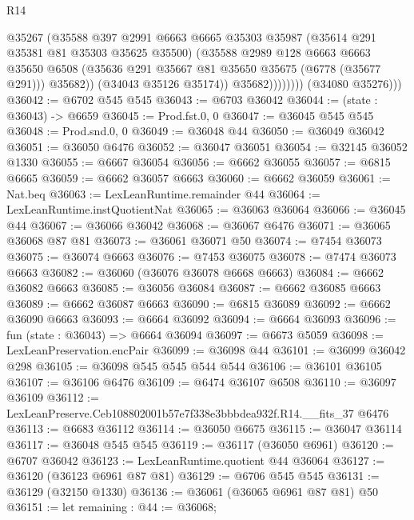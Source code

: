 \begin{lexlean}{R14}
\begin{coremodule}
                          @35267
                          (@35588
                            @397
                            @2991
                            @6663
                            @6665
                            @35303
                            @35987
                            (@35614 @291 @35381 @81 @35303 @35625 @35500)
                            (@35588
                              @2989
                              @128
                              @6663
                              @6663
                              @35650
                              @6508
                              (@35636 @291 @35667 @81 @35650 @35675 (@6778 (@35677 @291)))
                              @35682))
                          (@34043 @35126 @35174))
                        @35682))))))))
        (@34080 @35276)))
@36042 := @6702 @545 @545
@36043 := @6703 @36042
@36044 := (state : @36043) -> @6659
@36045 := Prod.fst.{0, 0}
@36047 := @36045 @545 @545
@36048 := Prod.snd.{0, 0}
@36049 := @36048 @44
@36050 := @36049 @36042
@36051 := @36050 @6476
@36052 := @36047 @36051
@36054 := @32145 @36052 @1330
@36055 := @6667 @36054
@36056 := @6662 @36055
@36057 := @6815 @6665
@36059 := @6662 @36057 @6663
@36060 := @6662 @36059
@36061 := Nat.beq
@36063 := LexLeanRuntime.remainder @44
@36064 := LexLeanRuntime.instQuotientNat
@36065 := @36063 @36064
@36066 := @36045 @44
@36067 := @36066 @36042
@36068 := @36067 @6476
@36071 := @36065 @36068 @87 @81
@36073 := @36061 @36071 @50
@36074 := @7454 @36073
@36075 := @36074 @6663
@36076 := @7453 @36075
@36078 := @7474 @36073 @6663
@36082 := @36060 (@36076 @36078 @6668 @6663)
@36084 := @6662 @36082 @6663
@36085 := @36056 @36084
@36087 := @6662 @36085 @6663
@36089 := @6662 @36087 @6663
@36090 := @6815 @36089
@36092 := @6662 @36090 @6663
@36093 := @6664 @36092
@36094 := @6664 @36093
@36096 := fun (state : @36043) => @6664 @36094
@36097 := @6673 @5059
@36098 := LexLeanPreservation.encPair
@36099 := @36098 @44
@36101 := @36099 @36042 @298
@36105 := @36098 @545 @545 @544 @544
@36106 := @36101 @36105
@36107 := @36106 @6476
@36109 := @6474 @36107 @6508
@36110 := @36097 @36109
@36112 := LexLeanPreserve.Ceb108802001b57e7f338e3bbbdea932f.R14.__fits_37 @6476
@36113 := @6683 @36112
@36114 := @36050 @6675
@36115 := @36047 @36114
@36117 := @36048 @545 @545
@36119 := @36117 (@36050 @6961)
@36120 := @6707 @36042
@36123 := LexLeanRuntime.quotient @44 @36064
@36127 := @36120 (@36123 @6961 @87 @81)
@36129 := @6706 @545 @545
@36131 := @36129 (@32150 @1330)
@36136 := @36061 (@36065 @6961 @87 @81) @50
@36151 := let remaining : @44 := @36068;

\end{coremodule}
\end{lexlean}
